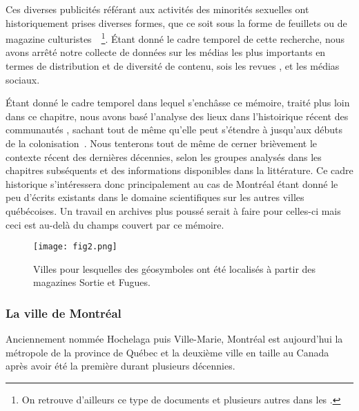 Ces diverses publicités référant aux activités des minorités sexuelles ont historiquement prises diverses formes, que ce soit sous la forme de feuillets ou de magazine culturistes~\citep{Higgins1999}~\footnote{On retrouve d'ailleurs ce   type de documents et plusieurs autres dans les \agq{}.}. 
Étant donné le cadre temporel de cette recherche, nous avons arrêté notre collecte de données sur les médias les plus importants en termes de distribution et de diversité de contenu, sois les revues \fugues{}, \sortie{} et les médias sociaux. 

Étant donné le cadre temporel dans lequel s’enchâsse ce mémoire, traité plus loin dans ce chapitre, nous avons basé l'analyse des lieux dans l'histoirique récent des communautés \lgbt{}, sachant tout de même qu'elle peut s'étendre à jusqu'aux débuts de la colonisation~\citep{Higgins1999}.
Nous tenterons tout de même de cerner brièvement le contexte récent des dernières décennies, selon les groupes analysés dans les chapitres subséquents et des informations disponibles dans la littérature. 
Ce cadre historique s'intéressera donc principalement au cas de Montréal étant donné le peu d'écrits existants dans le domaine scientifiques sur les autres villes québécoises. 
Un travail en archives plus poussé serait à faire pour celles-ci mais ceci est au-delà du champs couvert par ce mémoire.

\begin{figure}[ht]
	\begin{center}
		\texttt{[image: fig2.png]}
	\end{center}
	\caption{Villes pour lesquelles des géosymboles ont été localisés à partir des
    magazines Sortie et Fugues.}\label{fig:carte_quebec}
\end{figure}

\subsubsection{La ville de Montréal}
\label{ssub:montreal}
Anciennement nommée Hochelaga puis Ville-Marie, Montréal est aujourd'hui la métropole de la province de Québec et la deuxième ville en taille au Canada après avoir été la première durant plusieurs décennies. 


